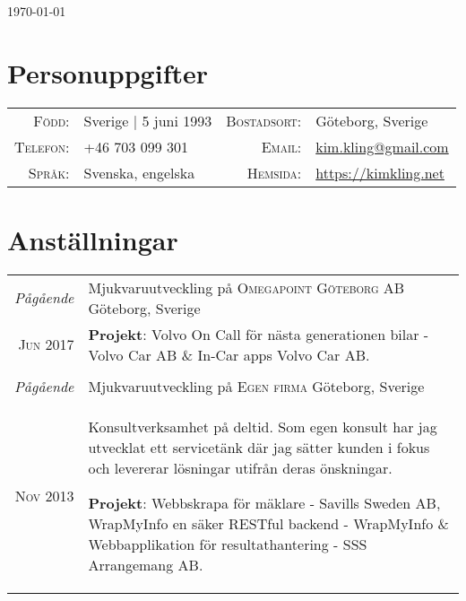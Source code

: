 \documentclass[a4paper,10pt]{scrartcl} %
\begin{document}
\pagestyle{empty} %


\hfill {\small \today}
\par{
	\bigskip\par
}

\section{Personuppgifter}

\begin{tabular}{rp{6cm}rl}
	\textsc{Född:}          & Sverige | 5 juni 1993 &
    \textsc{Bostadsort:}    & Göteborg, Sverige \\
	
	\textsc{Telefon:}       & +46 703 099 301 &
	\textsc{Email:}         & \href{mailto:kim.kling@gmail.com}{kim.kling@gmail.com} \\
	
	\textsc{Språk:}         & Svenska, engelska &
	\textsc{Hemsida:}       & \href{https://kimkling.net}{https://kimkling.net}
\end{tabular}



\section{Anställningar}

\begin{tabular}{r|p{15cm}}
\emph{Pågående} 	                & Mjukvaruutveckling på \textsc{Omegapoint Göteborg AB} \hfill Göteborg, Sverige \\
\phantom{ab} \textsc{Jun 2017} 	    & \footnotesize{
\textbf{Projekt}: Volvo On Call för nästa generationen bilar - Volvo Car AB \& In-Car apps Volvo Car AB.} \\
\multicolumn{2}{c}{} \\


\emph{Pågående} 	                & Mjukvaruutveckling på \textsc{Egen firma} \hfill Göteborg, Sverige \\
\phantom{ab} \textsc{Nov 2013} 	    & \footnotesize{Konsultverksamhet på deltid. Som egen konsult har jag utvecklat ett servicetänk där jag sätter kunden i fokus och levererar lösningar utifrån deras önskningar.

\textbf{Projekt}: Webbskrapa för mäklare - Savills Sweden AB, WrapMyInfo en säker RESTful backend - WrapMyInfo \& Webbapplikation för resultathantering - SSS Arrangemang AB.} \\

\end{tabular}
\end{document}
